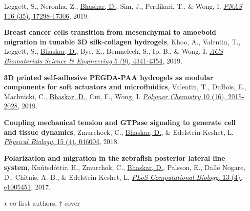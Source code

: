 \documentclass[margin,line]{res}
\begin{document}
\begin{resume}
{\begin{etaremune}[start=16]
Leggett, S., Neronha, Z., \underline{Bhaskar, D.}, Sim, J., Perdikari, T., \& Wong, I. 
\href{https://www.pnas.org/content/116/35/17298.short}{\textit{PNAS} 116 (35), 17298-17306}, 2019.
\item{\bf Breast cancer cells transition from mesenchymal to amoeboid migration in tunable 3D silk-collagen hydrogels},
Khoo, A., Valentin, T., Leggett, S., \underline{Bhaskar, D.}, Bye, E., Benmelech, S., Ip, B., \& Wong, I. 
\href{https://pubs.acs.org/doi/abs/10.1021/acsbiomaterials.9b00519}{\textit{ACS Biomaterials Science \& Engineering} 5 (9), 4341-4354}, 2019.
\vspace*{.1cm}
\item{\bf 3D printed self-adhesive PEGDA-PAA hydrogels as modular components for soft actuators and microfluidics}, 
Valentin, T., DuBois, E., Machnicki, C., \underline{Bhaskar, D.}, Cui, F., Wong, I. 
\href{https://pubs.rsc.org/ko/content/articlehtml/2019/py/c9py00211a}{\textit{Polymer Chemistry} 10 (16), 2015-2028}, 2019.
\vspace*{.1cm}
\item{\bf Coupling mechanical tension and GTPase signaling to generate cell and tissue dynamics}, 
Zmurchock, C., \underline{Bhaskar, D.}, \& Edelstein-Keshet, L. 
\href{https://iopscience.iop.org/article/10.1088/1478-3975/aab1c0/meta}{\textit{Physical Biology}, 15 (4), 046004}, 2018.
\vspace*{.1cm}
\item{\bf Polarization and migration in the zebrafish posterior lateral line system}, 
Kn\'{u}tsd\'{o}ttir, H., Zmurchok, C., \underline{Bhaskar, D.}, Palsson, E., Dalle Nogare, D., Chitnis, A. B., \& Edelstein-Keshet, L. 
\href{https://journals.plos.org/ploscompbiol/article?id=10.1371/journal.pcbi.1005451&rev=2}{\textit{PLoS Computational Biology}, 13 (4), e1005451}, 2017.
\item[] $\star$ co-first authors, $\dagger$ cover
\end{etaremune}
}

\vspace*{.15cm}

%




\end{resume}
\end{document}
